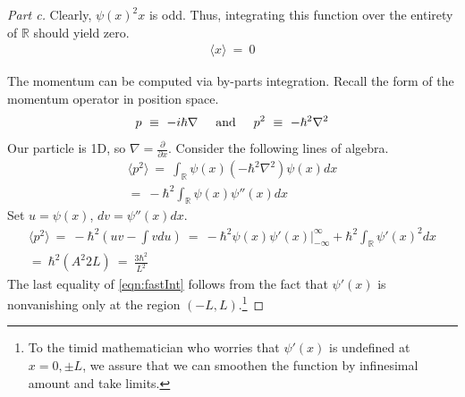 \documentclass{article}
\numberwithin{equation}{section}
\def\<{{\langle}}
\def\>{{\rangle}}
\newcommand{\pderiv}[2]{
\frac {\partial {#1} } {\partial {#2}}
}
\newcommand{\textAnd}{
    {
        \hspace{5mm}
        \textrm{and}
        \hspace{5mm}
    }
}
\newcommand{\RR}{\mathbb{R}}
\begin{document}
\begin{proof}
    [Part c]
    Clearly, $\psi(x)^2 x$ is odd. Thus, integrating 
    this function over the entirety of $\mathbb R$ should yield 
    zero. 
    \begin{align}
        \<x\> \ = \ 0
    \end{align} 

    The momentum can be computed via by-parts integration. 
    Recall the form of the momentum operator in position space. 
    \begin{align}
        p \ \equiv \ -i \hbar \nabla \textAnd p^2 \ \equiv \ -\hbar^2 \nabla^2
    \end{align}
    Our particle is 1D, so $\nabla = \pderiv{}{x}$. Consider the 
    following lines of algebra. 
    \begin{align}
        \<p^2\> \ = \ \int_{\mathbb R} \psi(x) (-\hbar^2 \nabla^2) \psi(x) dx \\ 
        = \ -\hbar^2 \int_{\RR} \psi(x) \psi''(x) dx  
    \end{align}
    Set $u = \psi(x)$, $dv = \psi''(x)dx$. 
    \begin{align}
        \<p^2\> \ = \ -\hbar^2 \left(uv - \int v du \right) \ = \ 
        -\hbar^2\psi(x)\psi'(x)\bigg|_{-\infty}^{\infty} + \hbar^2 \int_{\RR} \psi'(x)^2 dx \nonumber\\\label{eqn:fastInt}
        = \ \hbar^2 (A^2 2 L) \ = \ \boxed{\frac {3\hbar^2} {L^2}}
    \end{align}
    The last equality of \eqref{eqn:fastInt} follows 
    from the fact that $\psi'(x)$ is nonvanishing only at the 
    region $(-L, L)$.\footnote{To the timid mathematician who 
    worries that $\psi'(x)$ is undefined at $x = 0, \pm L$, we 
    assure that we can smoothen the function by infinesimal amount and take limits. }
\end{proof}
\end{document}
